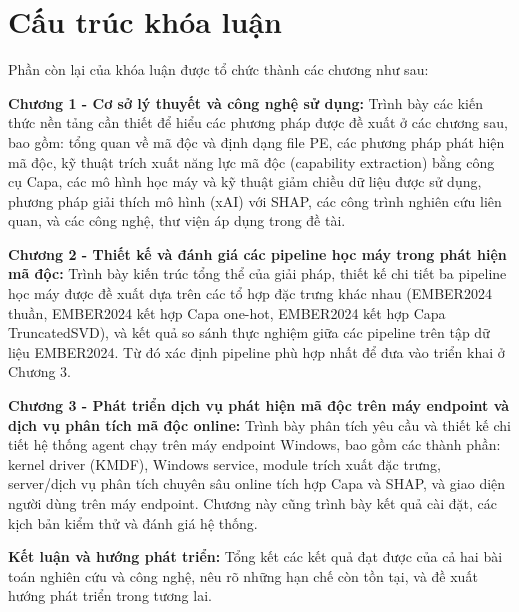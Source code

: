 \section*{Cấu trúc khóa luận}

Phần còn lại của khóa luận được tổ chức thành các chương như sau:

\textbf{Chương 1 - Cơ sở lý thuyết và công nghệ sử dụng:}
Trình bày các kiến thức nền tảng cần thiết để hiểu các phương pháp
được đề xuất ở các chương sau, bao gồm: tổng quan về mã độc và định
dạng file PE, các phương pháp phát hiện mã độc, kỹ thuật trích xuất
năng lực mã độc (capability extraction) bằng công cụ Capa, các mô hình
học máy và kỹ thuật giảm chiều dữ liệu được sử dụng, phương pháp giải
thích mô hình (xAI) với SHAP, các công trình nghiên cứu liên quan, và
các công nghệ, thư viện áp dụng trong đề tài.

\textbf{Chương 2 - Thiết kế và đánh giá các pipeline học máy trong
phát hiện mã độc:}
Trình bày kiến trúc tổng thể của giải pháp, thiết kế chi tiết ba
pipeline học máy được đề xuất dựa trên các tổ hợp đặc trưng khác nhau
(EMBER2024 thuần, EMBER2024 kết hợp Capa one-hot, EMBER2024 kết hợp
Capa TruncatedSVD), và kết quả so sánh thực nghiệm giữa các pipeline
trên tập dữ liệu EMBER2024. Từ đó xác định pipeline phù hợp nhất để
đưa vào triển khai ở Chương 3.

\textbf{Chương 3 - Phát triển dịch vụ phát hiện mã độc trên máy endpoint và dịch vụ phân tích mã độc online:}
Trình bày phân tích yêu cầu và thiết kế chi tiết hệ thống agent chạy
trên máy endpoint Windows, bao gồm các thành phần: kernel driver
(KMDF), Windows service, module trích xuất đặc trưng, server/dịch vụ
phân tích chuyên sâu online tích hợp Capa và SHAP, và giao diện người
dùng trên máy endpoint. Chương này cũng trình bày kết quả cài đặt,
các kịch bản kiểm thử và đánh giá hệ thống.

\textbf{Kết luận và hướng phát triển:}
Tổng kết các kết quả đạt được của cả hai bài toán nghiên cứu và công
nghệ, nêu rõ những hạn chế còn tồn tại, và đề xuất hướng phát triển
trong tương lai.
